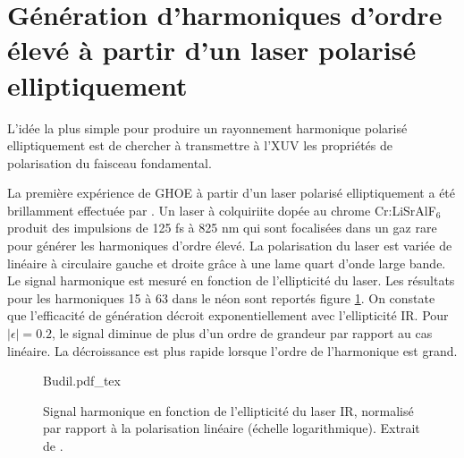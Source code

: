 \section{Génération d'harmoniques d'ordre élevé à partir d'un laser polarisé elliptiquement}
L'idée la plus simple pour produire un rayonnement harmonique polarisé elliptiquement est de chercher à transmettre à l'XUV les propriétés de polarisation du faisceau fondamental.

La première expérience de GHOE à partir d'un laser polarisé elliptiquement a été brillamment effectuée par . Un laser à colquiriite dopée au chrome Cr:LiSrAlF$_6$ produit des impulsions de 125 fs à 825 nm qui sont focalisées dans un gaz rare pour générer les harmoniques d'ordre élevé. La polarisation du laser est variée  de linéaire à circulaire gauche et droite grâce à une lame quart d'onde large bande. Le signal harmonique est mesuré en fonction de l'ellipticité du laser. Les résultats pour les harmoniques 15 à 63 dans le néon sont reportés figure \ref{fig:Budil}. On constate que l'efficacité de génération décroit exponentiellement avec l'ellipticité IR. Pour $|\epsilon| = 0.2$, le signal diminue de plus d'un ordre de grandeur par rapport au cas linéaire. La décroissance est plus rapide lorsque l'ordre de l'harmonique est grand.

\begin{figure}
\centering
\def\svgwidth{0.8\textwidth}
{Budil.pdf_tex}
\caption{Signal harmonique en fonction de l'ellipticité du laser IR, normalisé par rapport à la polarisation linéaire (échelle logarithmique). Extrait de .}
\label{fig:Budil}
\end{figure}

